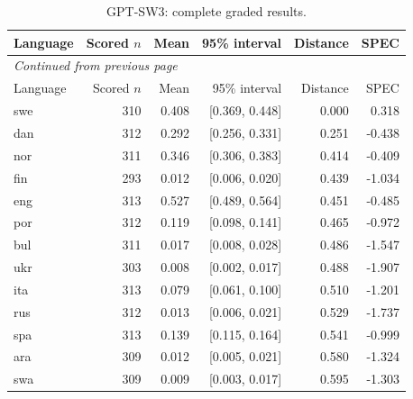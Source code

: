 \endgroup

\begingroup\footnotesize\setlength{\tabcolsep}{3pt}\renewcommand{\arraystretch}{1.12}

\begin{longtable}{lrrrrr}

\caption{GPT-SW3: complete graded results.}\label{tab:detail-gpt_sw3}\\

\toprule

Language & Scored $n$ & Mean & 95\% interval & Distance & SPEC\\\midrule

\endfirsthead

\multicolumn{6}{l}{\textit{Continued from previous page}}\\

\toprule

Language & Scored $n$ & Mean & 95\% interval & Distance & SPEC\\\midrule

\endhead

\bottomrule\endfoot

swe & 310 & 0.408 & [0.369, 0.448] & 0.000 & 0.318\\

dan & 312 & 0.292 & [0.256, 0.331] & 0.251 & -0.438\\

nor & 311 & 0.346 & [0.306, 0.383] & 0.414 & -0.409\\

fin & 293 & 0.012 & [0.006, 0.020] & 0.439 & -1.034\\

eng & 313 & 0.527 & [0.489, 0.564] & 0.451 & -0.485\\

por & 312 & 0.119 & [0.098, 0.141] & 0.465 & -0.972\\

bul & 311 & 0.017 & [0.008, 0.028] & 0.486 & -1.547\\

ukr & 303 & 0.008 & [0.002, 0.017] & 0.488 & -1.907\\

ita & 313 & 0.079 & [0.061, 0.100] & 0.510 & -1.201\\

rus & 312 & 0.013 & [0.006, 0.021] & 0.529 & -1.737\\

spa & 313 & 0.139 & [0.115, 0.164] & 0.541 & -0.999\\

ara & 309 & 0.012 & [0.005, 0.021] & 0.580 & -1.324\\

swa & 309 & 0.009 & [0.003, 0.017] & 0.595 & -1.303\\

\end{longtable}

